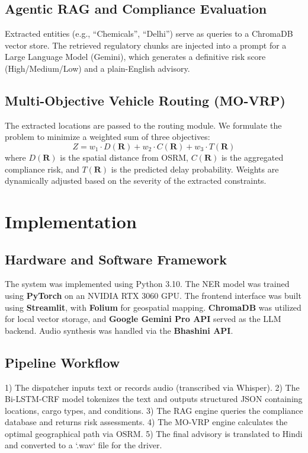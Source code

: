 \documentclass[conference]{IEEEtran}
\begin{document}
\subsection{Agentic RAG and Compliance Evaluation}
Extracted entities (e.g., ``Chemicals'', ``Delhi'') serve as queries to a ChromaDB vector store. The retrieved regulatory chunks are injected into a prompt for a Large Language Model (Gemini), which generates a definitive risk score (High/Medium/Low) and a plain-English advisory.

\subsection{Multi-Objective Vehicle Routing (MO-VRP)}
The extracted locations are passed to the routing module. We formulate the problem to minimize a weighted sum of three objectives:
\begin{equation}
Z = w_1 \cdot D(\mathbf{R}) + w_2 \cdot C(\mathbf{R}) + w_3 \cdot T(\mathbf{R})
\end{equation}
where $D(\mathbf{R})$ is the spatial distance from OSRM, $C(\mathbf{R})$ is the aggregated compliance risk, and $T(\mathbf{R})$ is the predicted delay probability. Weights are dynamically adjusted based on the severity of the extracted constraints.

\section{Implementation}

\subsection{Hardware and Software Framework}
The system was implemented using Python 3.10. The NER model was trained using \textbf{PyTorch} on an NVIDIA RTX 3060 GPU. The frontend interface was built using \textbf{Streamlit}, with \textbf{Folium} for geospatial mapping. \textbf{ChromaDB} was utilized for local vector storage, and \textbf{Google Gemini Pro API} served as the LLM backend. Audio synthesis was handled via the \textbf{Bhashini API}.

\subsection{Pipeline Workflow}
1) The dispatcher inputs text or records audio (transcribed via Whisper).
2) The Bi-LSTM-CRF model tokenizes the text and outputs structured JSON containing locations, cargo types, and conditions.
3) The RAG engine queries the compliance database and returns risk assessments.
4) The MO-VRP engine calculates the optimal geographical path via OSRM.
5) The final advisory is translated to Hindi and converted to a `.wav` file for the driver.
\end{document}
